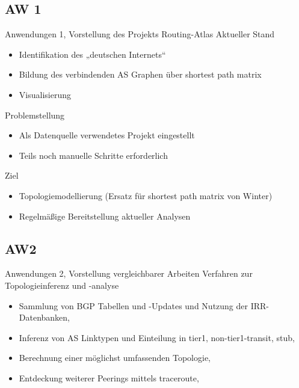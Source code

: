 \documentclass[ngerman,compress,hyperref={bookmarks}]{beamer}
\begin{document}
\subsection{AW 1}
\begin{frame}{Anwendungen 1, \cite{KrohnAW1}}{Vorstellung des Projekts Routing-Atlas}
  Aktueller Stand\\
  \begin{itemize}
    \item Identifikation des „deutschen Internets“
    \item Bildung des verbindenden AS Graphen über shortest path matrix
    \item Visualisierung
  \end{itemize}
  \vspace{0.3cm}
  Problemstellung\\
  \begin{itemize}
    \item Als Datenquelle verwendetes Projekt eingestellt
    \item Teils noch manuelle Schritte erforderlich
  \end{itemize}
  \vspace{0.3cm}
  Ziel\\
  \begin{itemize}
    \item Topologiemodellierung (Ersatz für shortest path matrix von Winter)
    \item Regelmäßige Bereitstellung aktueller Analysen
  \end{itemize}
\end{frame}

\subsection{AW2}
\begin{frame}{Anwendungen 2, \cite{KrohnAW2}}{Vorstellung vergleichbarer Arbeiten}
  Verfahren zur Topologieinferenz und -analyse
  \begin{itemize}
    \item Sammlung von BGP Tabellen und -Updates und Nutzung der IRR-Datenbanken, \cite{Zhang:2005:CIA:1052812.1052825}
    \item Inferenz von AS Linktypen und Einteilung in tier1, non-tier1-transit, stub, \cite{Gao:2001:IAS:504611.504616}
    \item Berechnung einer möglichst umfassenden Topologie, \cite{Winter:2009:MIR:1577959.1577976}
    \item Entdeckung weiterer Peerings mittels traceroute, \cite{Augustin:2009:IM:1644893.1644934}
  \end{itemize}
\end{frame}
\end{document}
